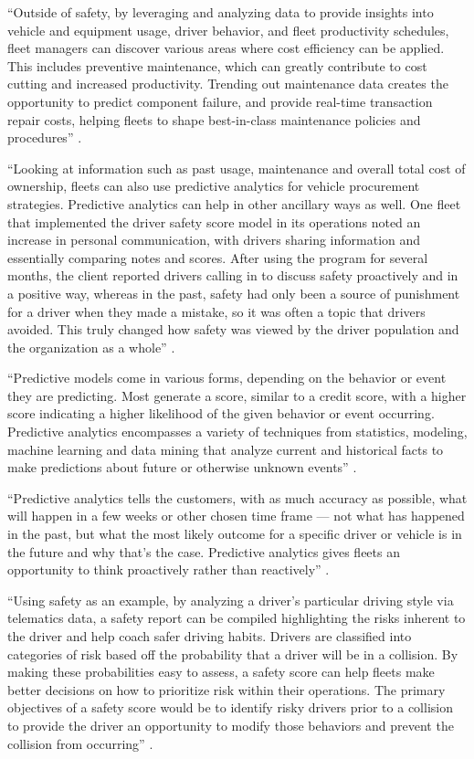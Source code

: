 ``Outside of safety, by leveraging and analyzing data to provide insights into vehicle and equipment usage, driver behavior, and fleet productivity schedules, fleet managers can discover various areas where cost efficiency can be applied. This includes preventive maintenance, which can greatly contribute to cost cutting and increased productivity. Trending out maintenance data creates the opportunity to predict component failure, and provide real-time transaction repair costs, helping fleets to shape best-in-class maintenance policies and procedures'' \cite{Suizo2015decisions}.

``Looking at information such as past usage, maintenance and overall total cost of ownership, fleets can also use predictive analytics for vehicle procurement strategies. Predictive analytics can help in other ancillary ways as well. One fleet that implemented the driver safety score model in its operations noted an increase in personal communication, with drivers sharing information and essentially comparing notes and scores. After using the program for several months, the client reported drivers calling in to discuss safety proactively and in a positive way, whereas in the past, safety had only been a source of punishment for a driver when they made a mistake, so it was often a topic that drivers avoided. This truly changed how safety was viewed by the driver population and the organization as a whole'' \cite{Suizo2015decisions}.

``Predictive models come in various forms, depending on the behavior or event they are predicting. Most generate a score, similar to a credit score, with a higher score indicating a higher likelihood of the given behavior or event occurring. Predictive analytics encompasses a variety of techniques from statistics, modeling, machine learning and data mining that analyze current and historical facts to make predictions about future or otherwise unknown events'' \cite{Suizo2015decisions}.

``Predictive analytics tells the customers, with as much accuracy as possible, what will happen in a few weeks or other chosen time frame — not what has happened in the past, but what the most likely outcome for a specific driver or vehicle is in the future and why that’s the case. Predictive analytics gives fleets an opportunity to think proactively rather than reactively'' \cite{Suizo2015decisions}.

``Using safety as an example, by analyzing a driver’s particular driving style via telematics data, a safety report can be compiled highlighting the risks inherent to the driver and help coach safer driving habits. Drivers are classified into categories of risk based off the probability that a driver will be in a collision. By making these probabilities easy to assess, a safety score can help fleets make better decisions on how to prioritize risk within their operations. The primary objectives of a safety score would be to identify risky drivers prior to a collision to provide the driver an opportunity to modify those behaviors and prevent the collision from occurring'' \cite{Suizo2015decisions}.

